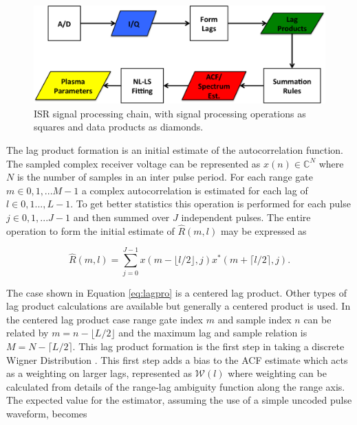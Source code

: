 \documentclass[draft,ras]{agutex}
\begin{document}
\begin{article}
\begin{figure}[!t]
\centering
\includegraphics[width=6in]{datastackchain}
\caption{ISR signal processing chain, with signal processing operations as squares and data products as diamonds.}
\label{fig:chain}
\end{figure}


The lag product formation is an initial estimate of the autocorrelation function. The sampled complex receiver voltage can be represented as $x(n) \in\mathbb{C}^N$ where $N$ is the number of samples in an inter pulse period. For each range gate $m\in 0,1,...M-1$ a complex autocorrelation is estimated for each lag of $l \in 0,1...,L-1$.  To get better statistics this operation is performed for each pulse $j\in 0,1,...J-1$ and then summed over $J$ independent pulses. The entire operation to form the initial estimate of $\widehat{R}(m,l)$ may be expressed as

\begin{equation}
\label{eq:lagpro}
\widehat{R}(m,l) = \displaystyle\sum\limits_{j=0}^{J-1} x(m-\lfloor l/2\rfloor,j)x^*(m+\lceil l/2 \rceil,j).
\end{equation}

The case shown in Equation \ref{eq:lagpro} is a centered lag product.  Other types of lag product calculations are available but generally a centered product is used. In the centered lag product case range gate index $m$ and sample index $n$ can be related by $m=n-\lfloor L/2\rfloor$ and the maximum lag and sample relation is $M=N-\lceil L/2 \rceil$.  This lag product formation is the first step in taking a discrete Wigner Distribution \citep{TFAcohen}. This first step adds a bias to the ACF estimate which acts as a weighting on larger lags, represented as $\mathcal{W}(l)$ where weighting can be calculated from details of the range-lag ambiguity function along the range axis. The expected value for the estimator, assuming the use of a simple uncoded pulse waveform, becomes


\end{article}
\end{document}
